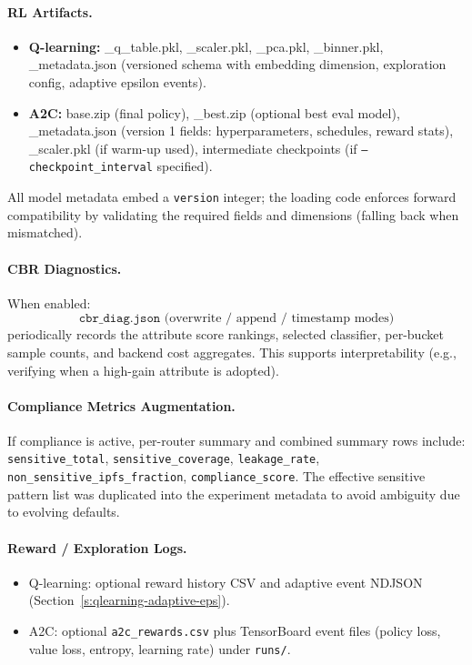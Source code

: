 \paragraph{RL Artifacts.}
\begin{itemize}
  \item \textbf{Q-learning:} \_q\_table.pkl, \_scaler.pkl, \_pca.pkl, \_binner.pkl, \_metadata.json (versioned schema with embedding dimension, exploration config, adaptive epsilon events).
  \item \textbf{A2C:} base.zip (final policy), \_best.zip (optional best eval model), \_metadata.json (version 1 fields: hyperparameters, schedules, reward stats), \_scaler.pkl (if warm-up used), intermediate checkpoints (if \texttt{--checkpoint\_interval} specified).
\end{itemize}
All model metadata embed a \texttt{version} integer; the loading code enforces forward compatibility by validating the required fields and dimensions (falling back when mismatched).

\paragraph{CBR Diagnostics.} When enabled:
\[
\texttt{cbr\_diag.json} \text{ (overwrite / append / timestamp modes)}
\]
periodically records the attribute score rankings, selected classifier, per-bucket sample counts, and backend cost aggregates. This supports interpretability (e.g., verifying when a high-gain attribute is adopted).

\paragraph{Compliance Metrics Augmentation.} If compliance is active, per-router summary and combined summary rows include: \texttt{sensitive\_total}, \texttt{sensitive\_coverage}, \texttt{leakage\_rate}, \texttt{non\_sensitive\_ipfs\_fraction}, \texttt{compliance\_score}. The effective sensitive pattern list was duplicated into the experiment metadata to avoid ambiguity due to evolving defaults.

\paragraph{Reward / Exploration Logs.}
\begin{itemize}
  \item Q-learning: optional reward history CSV and adaptive event NDJSON (Section~\ref{s:qlearning-adaptive-eps}).
  \item A2C: optional \texttt{a2c\_rewards.csv} plus TensorBoard event files (policy loss, value loss, entropy, learning rate) under \texttt{runs/}.
\end{itemize}

